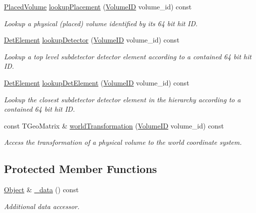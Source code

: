 \begin{DoxyCompactItemize}
\hyperlink{class_d_d4hep_1_1_geometry_1_1_placed_volume}{Placed\+Volume} \hyperlink{class_d_d4hep_1_1_geometry_1_1_volume_manager_aff0f31cb3233b2ebf3d99e5769737e94}{lookup\+Placement} (\hyperlink{class_d_d4hep_1_1_geometry_1_1_volume_manager_ab1f746b561c93be38bc7c6e66fc8ca8a}{Volume\+ID} volume\+\_\+id) const
\begin{DoxyCompactList}\small\item\em Lookup a physical (placed) volume identified by its 64 bit hit ID. \end{DoxyCompactList}\item 
\hyperlink{class_d_d4hep_1_1_geometry_1_1_det_element}{Det\+Element} \hyperlink{class_d_d4hep_1_1_geometry_1_1_volume_manager_a1b674c835b5dc04d22ab1e4c2cd52775}{lookup\+Detector} (\hyperlink{class_d_d4hep_1_1_geometry_1_1_volume_manager_ab1f746b561c93be38bc7c6e66fc8ca8a}{Volume\+ID} volume\+\_\+id) const
\begin{DoxyCompactList}\small\item\em Lookup a top level subdetector detector element according to a contained 64 bit hit ID. \end{DoxyCompactList}\item 
\hyperlink{class_d_d4hep_1_1_geometry_1_1_det_element}{Det\+Element} \hyperlink{class_d_d4hep_1_1_geometry_1_1_volume_manager_ab1be2614964d7ecc227ba03639e55894}{lookup\+Det\+Element} (\hyperlink{class_d_d4hep_1_1_geometry_1_1_volume_manager_ab1f746b561c93be38bc7c6e66fc8ca8a}{Volume\+ID} volume\+\_\+id) const
\begin{DoxyCompactList}\small\item\em Lookup the closest subdetector detector element in the hierarchy according to a contained 64 bit hit ID. \end{DoxyCompactList}\item 
const T\+Geo\+Matrix \& \hyperlink{class_d_d4hep_1_1_geometry_1_1_volume_manager_a3d94720b4fe3f949fbfe9c3c332147dc}{world\+Transformation} (\hyperlink{class_d_d4hep_1_1_geometry_1_1_volume_manager_ab1f746b561c93be38bc7c6e66fc8ca8a}{Volume\+ID} volume\+\_\+id) const
\begin{DoxyCompactList}\small\item\em Access the transformation of a physical volume to the world coordinate system. \end{DoxyCompactList}\end{DoxyCompactItemize}
\subsection*{Protected Member Functions}
\begin{DoxyCompactItemize}
\item 
\hyperlink{class_d_d4hep_1_1_geometry_1_1_volume_manager_ac464fd441e5c72fb082e8cc6dd0937c4}{Object} \& \hyperlink{class_d_d4hep_1_1_geometry_1_1_volume_manager_ae553c9b75d52a6ed8d38867fca2cf9a0}{\+\_\+data} () const
\begin{DoxyCompactList}\small\item\em Additional data accessor. \end{DoxyCompactList}\end{DoxyCompactItemize}
